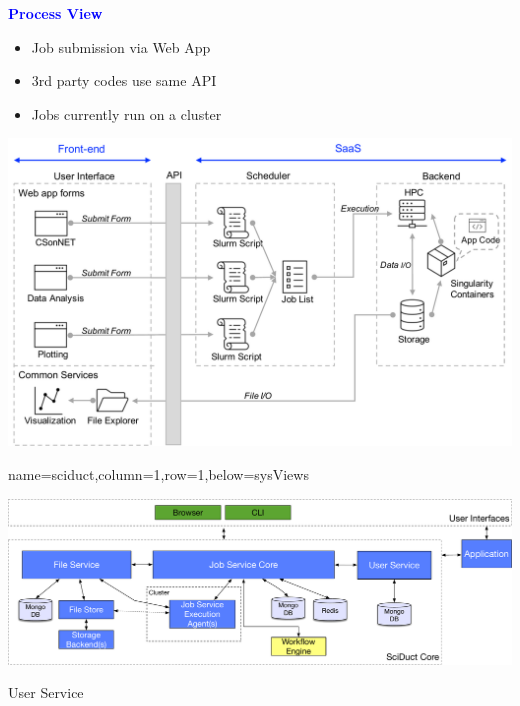 \documentclass[landscape,paperwidth=70in,paperheight=46in,fontscale=0.225]{baposter} %
\begin{document}
\begin{poster}
{\begin{center}
\textcolor{blue}{\large\textbf{Process View}}
\end{center}
\vspace{-5mm}
\begin{minipage}{.24\textwidth}
\begin{itemize}[leftmargin=*,noitemsep,topsep=0pt]
\item Job submission via Web App \smallskip
\item 3rd party codes use same API \smallskip
\item Jobs currently run on a cluster
\end{itemize}
\end{minipage}
\qquad
\begin{minipage}{.73\textwidth}
\vspace{5mm}
\includegraphics[scale=0.20]{figures/netsci_ops_v6.pdf}
\end{minipage}

}

          {name=sciduct,column=1,row=1,below=sysViews}{
          
\includegraphics[scale=0.21]{figures/SciDuctComponents_legacy.pdf}


\vspace{5mm}
\noindent 
\begin{minipage}[t]{0.32\columnwidth}
User Service


\end{minipage}}
\end{poster}
\end{document}
